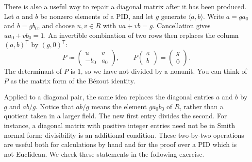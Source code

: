 \documentclass[12pt,reqno]{amsart}
\begin{document}
\hrulefill

There is also a useful way to repair a diagonal matrix after it has been produced. Let $a$ and $b$ be nonzero elements of a PID, and let $g$ generate $\langle a,b\rangle$. Write $a=ga_0$ and $b=gb_0$, and choose $u,v\in R$ with $ua+vb=g$. Cancellation gives $ua_0+vb_0=1$. An invertible combination of two rows then replaces the column $(a,b)^{\mathsf T}$ by $(g,0)^{\mathsf T}$:
\[
P\coloneqq\begin{pmatrix}u&v\\-b_0&a_0\end{pmatrix},
\qquad
P\begin{pmatrix}a\\b\end{pmatrix}=\begin{pmatrix}g\\0\end{pmatrix}.
\]
The determinant of $P$ is $1$, so we have not divided by a nonunit. You can think of $P$ as the matrix form of the B\'ezout identity.

Applied to a diagonal pair, the same idea replaces the diagonal entries $a$ and $b$ by $g$ and $ab/g$. Notice that $ab/g$ means the element $ga_0b_0$ of $R$, rather than a quotient taken in a larger field. The new first entry divides the second. For instance, a diagonal matrix with positive integer entries need not be in Smith normal form: divisibility is an additional condition. These two-by-two operations are useful both for calculations by hand and for the proof over a PID which is not Euclidean. We check these statements in the following exercise.

\hrulefill
\end{document}
